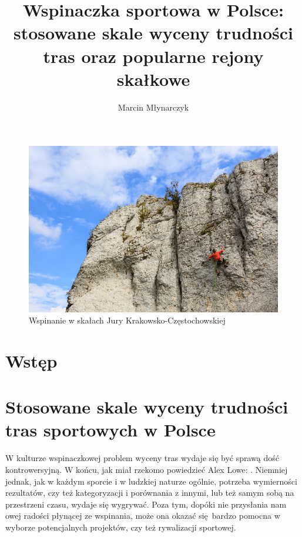 \documentclass{article}
\title{Wspinaczka sportowa w Polsce: stosowane skale wyceny trudności tras oraz popularne rejony skałkowe}
\author{Marcin Młynarczyk}
\date{\displaydate{date}}
\begin{document}
\maketitle
\tableofcontents

\bigskip

\begin{figure}[!htbp]
	\begin{center}
		\includegraphics[width=0.9\linewidth]{images/wspin-jura.eps}
	\end{center}
	\caption{Wspinanie w skałach Jury Krakowsko-Częstochowskiej \cite{jura-intro}}
	\label{}
\end{figure}

\section{Wstęp}

\section{Stosowane skale wyceny trudności tras sportowych w Polsce}
\lettrine[lines=2]{W}{} kulturze wspinaczkowej problem wyceny tras wydaje się być sprawą dość kontrowersyjną. W końcu, jak miał rzekomo powiedzieć Alex Lowe:  \cite{alex-lowe}. Niemniej jednak, jak w każdym sporcie i w ludzkiej naturze ogólnie, potrzeba wymierności rezultatów, czy też kategoryzacji i porównania z innymi, lub też samym sobą na przestrzeni czasu, wydaje się wygrywać. Poza tym, dopóki  nie przysłania nam owej radości płynącej ze wspinania, może ona okazać się bardzo pomocna w wyborze potencjalnych projektów, czy też rywalizacji sportowej. 
\end{document}

